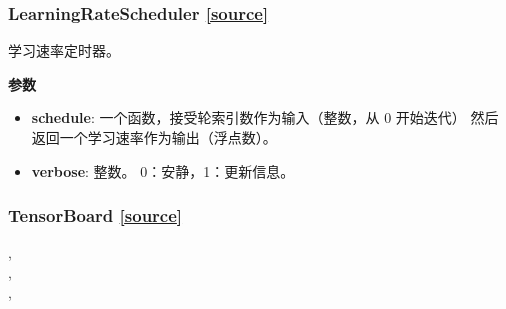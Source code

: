 \subsubsection{LearningRateScheduler {\href{https://github.com/keras-team/keras/blob/master/keras/callbacks.py\#L559}{{[}source{]}}}}

\begin{Shaded}
\begin{Highlighting}[]
\OperatorTok{=}\NormalTok{)}
\end{Highlighting}
\end{Shaded}

学习速率定时器。

\textbf{参数}

\begin{itemize}
\tightlist
\item
  \textbf{schedule}: 一个函数，接受轮索引数作为输入（整数，从 0
  开始迭代） 然后返回一个学习速率作为输出（浮点数）。
\item
  \textbf{verbose}: 整数。 0：安静，1：更新信息。
\end{itemize}



\subsubsection{TensorBoard {\href{https://github.com/keras-team/keras/blob/master/keras/callbacks.py\#L587}{{[}source{]}}}}

\begin{Shaded}
\begin{Highlighting}[]
\OperatorTok{=}\OperatorTok{=}\OperatorTok{=}, \\
\hspace{3cm}\OperatorTok{=}\OperatorTok{=}\OperatorTok{=}, \\
\hspace{3cm}\OperatorTok{=}\OperatorTok{=}, \\
\hspace{3cm}\OperatorTok{=}\NormalTok{)}
\end{Highlighting}
\end{Shaded}

